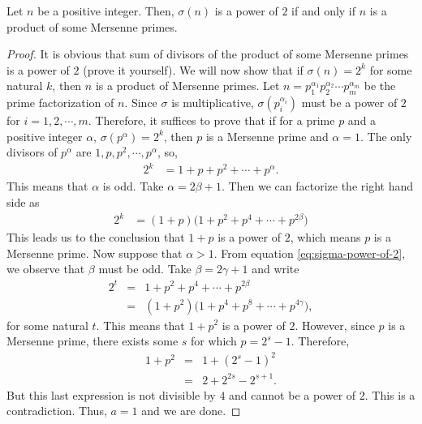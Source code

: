 \documentclass[12pt]{subfile}
\begin{document}
	\begin{theorem}
		Let $n$ be a positive integer. Then, $\sigma(n)$ is a power of $2$ if and only if $n$ is a product of some Mersenne primes.
	\end{theorem}

	\begin{proof}
		It is obvious that sum of divisors of the product of some Mersenne primes is a power of $2$ (prove it yourself). We will now show that if $\sigma(n)=2^k$ for some natural $k$, then $n$ is a product of Mersenne primes. Let $n = p_1^{\alpha_1}p_2^{\alpha_2} \cdots p_m^{\alpha_m}$ be the prime factorization of $n$. Since $\sigma$ is multiplicative,  $\sigma(p_i^{\alpha_i})$ must be a power of $2$ for $i=1,2,\cdots,m$. Therefore, it suffices to prove that if for a prime $p$ and a positive integer $\alpha$, $\sigma(p^\alpha) = 2^k$, then $p$ is a Mersenne prime and $\alpha = 1$. The only divisors of $p^\alpha$ are $1,p,p^2,\cdots,p^\alpha$, so,
			\begin{align*}
				2^k &= 1 + p + p^2 + \cdots + p^\alpha.
			\end{align*}
		This means that $\alpha$ is odd. Take $\alpha= 2\beta+ 1$. Then we can factorize the right hand side as
			\begin{align}
				2^k &= (1+p)\Big(1 + p^2 + p^4 + \cdots + p^{2\beta}\Big) \label{eq:sigma-power-of-2}
			\end{align}
		This leads us to the conclusion that $1+p$ is a power of $2$, which means $p$ is a Mersenne prime. Now suppose that $\alpha > 1$. From equation \eqref{eq:sigma-power-of-2}, we observe that $\beta$ must be odd. Take $\beta = 2 \gamma + 1$ and write
			\begin{eqnarray*}
				2^t &=& 1 + p^2 + p^4 + \cdots + p^{2\beta}\\
					&=& \left(1+p^2\right)\Big(1+p^4 + p^8 + \cdots + p^{4 \gamma}\Big),
			\end{eqnarray*}
		for some natural $t$. This means that $1+p^2$ is a power of $2$. However, since $p$ is a Mersenne prime, there exists some $s$ for which $p=2^s - 1$. Therefore,
			\begin{eqnarray*}
				1+p^2 &=& 1 + (2^s -1)^2\\
					  &=& 2 + 2^{2s} - 2^{s+1}.
			\end{eqnarray*}
		But this last expression is not divisible by $4$ and cannot be a power of $2$. This is a contradiction. Thus, $a=1$ and we are done.
	\end{proof}
\end{document}
